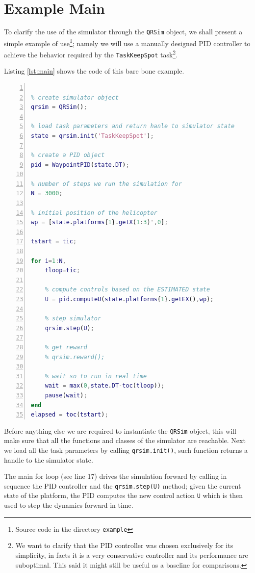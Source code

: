 \documentclass[a4paper,11pt]{report}
\newcommand{\snamettt}{\texttt{QRSim}\xspace}
\begin{document}
\section{Example Main}
To clarify the use of the simulator through the \snamettt object, we shall present a simple example of use\footnote{Source code in the directory \texttt{example}}; namely we will use a manually designed PID controller to achieve the behavior required by the \texttt{TaskKeepSpot} task\footnote{We want to clarify that the PID controller was chosen exclusively for its simplicity, in facts it is a very conservative controller and its performance are suboptimal. This said it might still be useful as a baseline for comparisons.}.

Listing \ref{lst:main} shows the code of this bare bone example. 

\begin{lstlisting}[float=ht!bp,caption=main script,language=Matlab,frame=lines,label=lst:main,numbers=left,basicstyle=\small]

% create simulator object
qrsim = QRSim();

% load task parameters and return hanle to simulator state
state = qrsim.init('TaskKeepSpot');

% create a PID object
pid = WaypointPID(state.DT);

% number of steps we run the simulation for
N = 3000;

% initial position of the helicopter
wp = [state.platforms{1}.getX(1:3)',0];

tstart = tic;

for i=1:N,
    tloop=tic;

    % compute controls based on the ESTIMATED state 
    U = pid.computeU(state.platforms{1}.getEX(),wp);

    % step simulator
    qrsim.step(U);
    
    % get reward
    % qrsim.reward();
    
    % wait so to run in real time
    wait = max(0,state.DT-toc(tloop));
    pause(wait);
end
elapsed = toc(tstart);
\end{lstlisting}
Before anything else we are required to instantiate the \snamettt object, this will make sure that all the functions and classes of the simulator are reachable. Next we load all the task parameters by calling \texttt{qrsim.init()}, such function returns a handle to the simulator state.

The main for loop (see line 17) drives the simulation forward by calling in sequence the PID controller and the \texttt{qrsim.step(U)} method; given the current state of the platform, the PID computes the new control action  \texttt{U} which is then used to step the dynamics forward in time.
\end{document}
